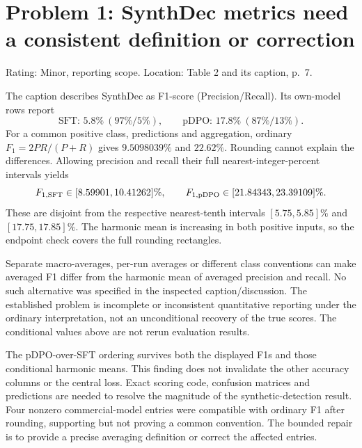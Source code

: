 \documentclass[10pt]{article}
\begin{document}
\section*{Problem 1: SynthDec metrics need a consistent definition or correction}
Rating: Minor, reporting scope. Location: Table 2 and its caption, p. 7.\par
The caption describes SynthDec as F1-score (Precision/Recall). Its own-model rows report \[\text{SFT: }5.8\%\ (97\%/5\%),\qquad
 \text{pDPO: }17.8\%\ (87\%/13\%).\] For a common positive class, predictions and aggregation, ordinary \(F_1=2PR/(P+R)\) gives \(9.5098039\%\) and \(22.62\%\). Rounding cannot explain the differences. Allowing precision and recall their full nearest-integer-percent intervals yields \[F_{1,\rm SFT}\in[8.59901,10.41262]\%,\qquad
 F_{1,\rm pDPO}\in[21.84343,23.39109]\%.\] These are disjoint from the respective nearest-tenth intervals \([5.75,5.85]\%\) and \([17.75,17.85]\%\). The harmonic mean is increasing in both positive inputs, so the endpoint check covers the full rounding rectangles.\par
Separate macro-averages, per-run averages or different class conventions can make averaged F1 differ from the harmonic mean of averaged precision and recall. No such alternative was specified in the inspected caption/discussion. The established problem is incomplete or inconsistent quantitative reporting under the ordinary interpretation, not an unconditional recovery of the true scores. The conditional values above are not rerun evaluation results.\par
The pDPO-over-SFT ordering survives both the displayed F1s and those conditional harmonic means. This finding does not invalidate the other accuracy columns or the central loss. Exact scoring code, confusion matrices and predictions are needed to resolve the magnitude of the synthetic-detection result. Four nonzero commercial-model entries were compatible with ordinary F1 after rounding, supporting but not proving a common convention. The bounded repair is to provide a precise averaging definition or correct the affected entries.\par
\end{document}
